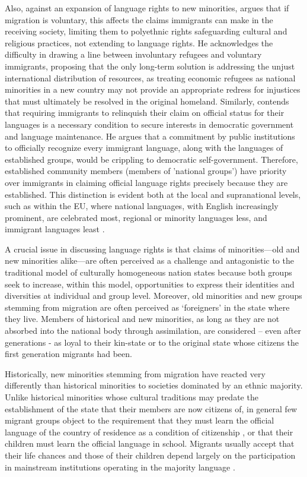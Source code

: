 \documentclass[output=paper,colorlinks,citecolor=brown]{langscibook}
\begin{document}
Also, against an expansion of language rights to new minorities, \citet{kymlicka1996} argues that if migration is voluntary, this affects the claims immigrants can make in the receiving society, limiting them to polyethnic rights safeguarding cultural and religious practices, not extending to language rights. He acknowledges the difficulty in drawing a line between involuntary refugees and voluntary immigrants, proposing that the only long-term solution is addressing the unjust international distribution of resources, as treating economic refugees as national minorities in a new country may not provide an appropriate redress for injustices that must ultimately be resolved in the original homeland. Similarly, \citet{patten2006} contends that requiring immigrants to relinquish their claim on official status for their languages is a necessary condition to secure interests in democratic government and language maintenance. He argues that a commitment by public institutions to officially recognize every immigrant language, along with the languages of established groups, would be crippling to democratic self-government. Therefore, established community members (members of 'national groups') have priority over immigrants in claiming official language rights precisely because they are established. This distinction is evident both at the local and supranational levels, such as within the EU, where national languages, with English increasingly prominent, are celebrated most, regional or minority languages less, and immigrant languages least \citep{extra2017}.

A crucial issue in discussing language rights is that claims of minorities—old and new minorities alike—are often perceived as a challenge and antagonistic to the traditional model of culturally homogeneous nation states because both groups seek to increase, within this model, opportunities to express their identities and diversities at individual and group level. Moreover, old minorities and new groups stemming from migration are often perceived as `foreigners' in the state where they live. Members of historical and new minorities, as long as they are not absorbed into the national body through assimilation, are considered – even after generations - as loyal to their kin-state or to the original state whose citizens the first generation migrants had been.

Historically, new minorities stemming from migration have reacted very differently than historical minorities to societies dominated by an ethnic majority. Unlike historical minorities whose cultural traditions may predate the establishment of the state that their members are now citizens of, in general few migrant groups object to the requirement that they must learn the official language of the country of residence as a condition of citizenship \citep{van_oers2014}, or that their children must learn the official language in school. Migrants usually accept that their life chances and those of their children depend largely on the participation in mainstream institutions operating in the majority language \citep{kymlicka2001}. 
\end{document}
